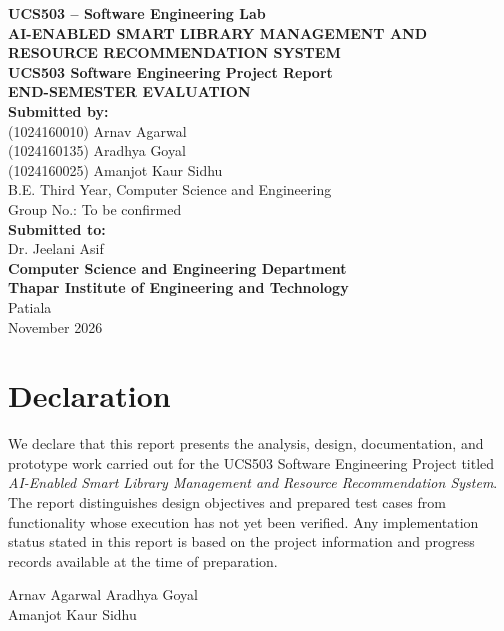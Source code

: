 \documentclass[12pt,a4paper]{report}
\begin{document}
\begin{titlepage}
\thispagestyle{empty}
\begin{center}
\vspace*{0.4cm}
{\large\bfseries UCS503 -- Software Engineering Lab}\\[1.2cm]
{\Large\bfseries AI-ENABLED SMART LIBRARY MANAGEMENT AND RESOURCE RECOMMENDATION SYSTEM}\\[0.7cm]
{\large\bfseries UCS503 Software Engineering Project Report}\\[0.35cm]
{\large\bfseries END-SEMESTER EVALUATION}\\[1.3cm]
{\large\bfseries Submitted by:}\\[0.45cm]
{\large (1024160010) Arnav Agarwal}\\[0.2cm]
{\large (1024160135) Aradhya Goyal}\\[0.2cm]
{\large (1024160025) Amanjot Kaur Sidhu}\\[0.55cm]
{\large B.E. Third Year, Computer Science and Engineering}\\[0.25cm]
{\large Group No.: To be confirmed}\\[1.0cm]
{\large\bfseries Submitted to:}\\[0.35cm]
{\large Dr. Jeelani Asif}\\[1.0cm]
\vfill
{\Large\bfseries Computer Science and Engineering Department}\\[0.25cm]
{\Large\bfseries Thapar Institute of Engineering and Technology}\\
{\large Patiala}\\[0.35cm]
{\large November 2026}
\end{center}
\end{titlepage}

\chapter*{Declaration}
We declare that this report presents the analysis, design, documentation, and prototype work carried out for the UCS503 Software Engineering Project titled \textit{AI-Enabled Smart Library Management and Resource Recommendation System}. The report distinguishes design objectives and prepared test cases from functionality whose execution has not yet been verified. Any implementation status stated in this report is based on the project information and progress records available at the time of preparation.

\vspace{1.5cm}
\noindent Arnav Agarwal \hfill Aradhya Goyal\\[1.0cm]
\noindent Amanjot Kaur Sidhu
\end{document}
